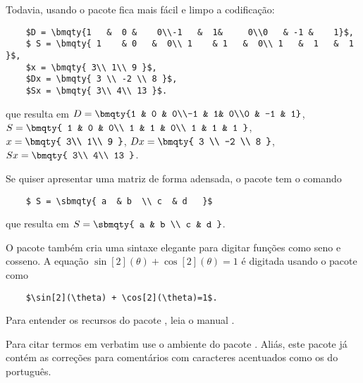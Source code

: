 Todavia, usando o pacote  fica mais  fácil e limpo a codificação:
\begin{verbatim}
	$D = \bmqty{1   &  0 &    0\\-1   &  1&     0\\0   & -1 &    1}$, 
	$ S = \bmqty{ 1    & 0   &  0\\ 1    & 1   &  0\\ 1   &  1   &  1 }$, 
	$x = \bmqty{ 3\\ 1\\ 9 }$,   
	$Dx = \bmqty{ 3 \\ -2 \\ 8 }$, 
	$Sx = \bmqty{ 3\\ 4\\ 13 }$.
\end{verbatim}

que resulta em 
$D = \bmqty{1   &  0 &    0\\-1   &  1&     0\\0   & -1 &    1}$, $ S = \bmqty{ 1    & 0   &  0\\ 1    & 1   &  0\\ 1   &  1   &  1 }$, $x = \bmqty{ 3\\ 1\\ 9 }$,   $Dx = \bmqty{ 3 \\ -2 \\ 8 }$, $Sx = \bmqty{ 3\\ 4\\ 13 }$.


Se quiser apresentar uma matriz de forma adensada, o pacote  tem o comando 
\begin{verbatim}
	$ S = \sbmqty{ a  & b  \\ c  & d   }$
\end{verbatim}
que resulta em $ S = \sbmqty{ a  & b  \\ c  & d   }$.

O pacote  também cria uma sintaxe elegante para digitar funções como seno e cosseno.
A equação $\sin[2](\theta) + \cos[2](\theta)=1$ é digitada usando o pacote  como
\begin{verbatim}
	$\sin[2](\theta) + \cos[2](\theta)=1$.
\end{verbatim}

Para entender os recursos do pacote , leia o manual .


Para citar termos em verbatim use o ambiente  do pacote . Aliás, este pacote  já contém as correções para comentários com caracteres acentuados como os do português.

